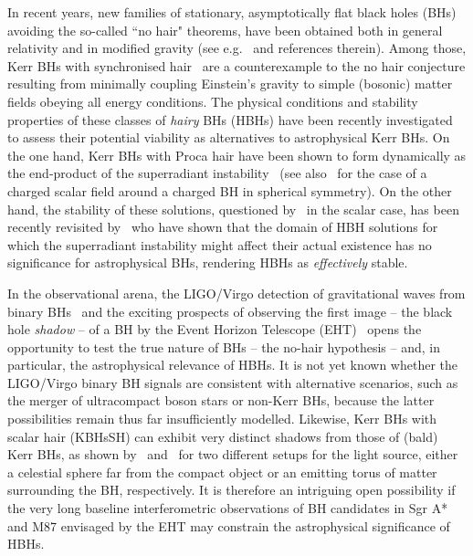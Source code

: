 \documentclass[twocolumn,aps,showpacs,showkeys,prd,superscriptaddress,byrevtex, amsmath]{revtex4-1}
\begin{document}
In recent years, new families of stationary, asymptotically flat black holes (BHs) avoiding the so-called ``no hair" theorems, have been obtained both in general relativity and in modified gravity (see e.g.~\cite{Herdeiro:2015_review} and references therein). Among those, Kerr BHs with synchronised hair~\cite{Herdeiro:2014a,Herdeiro:2016} are a counterexample to the no hair conjecture resulting from minimally coupling Einstein's gravity to simple (bosonic) matter fields obeying all energy conditions. The physical conditions and stability properties of these classes of {\it hairy} BHs  (HBHs) have been recently investigated to assess their potential viability as  alternatives to astrophysical Kerr BHs.  On the one hand, Kerr BHs with Proca hair have been shown to form dynamically as the end-product of the superradiant instability~\cite{East:2017,Herdeiro:2017} (see also~\cite{Sanchis-Gual:2016,Bosch:2016} for the case of a charged scalar field around a charged BH in spherical  symmetry). On the other hand, the stability of these solutions, questioned by~\cite{Ganchev:2018} in the scalar case, has been recently revisited by~\cite{Degollado:2018} who have shown that the domain of HBH solutions for which the superradiant instability might affect their actual existence has no significance for astrophysical BHs, rendering HBHs as {\it effectively} stable.

In the observational arena, the LIGO/Virgo detection of gravitational waves from binary BHs~\cite{Abbott2016, Abbott:2016nmj, Abbott:2017vtc, Abbott:2017oio, Abbott:2017gyy} and the exciting prospects of observing the first image -- the black hole {\it shadow} -- of a BH by the Event Horizon Telescope (EHT)~\cite{Fish:2016} opens the opportunity to test the true nature of BHs -- the no-hair hypothesis -- and, in particular, the astrophysical relevance of HBHs. It is not yet known whether the LIGO/Virgo binary BH signals are consistent with alternative scenarios, such as the merger of ultracompact boson stars or non-Kerr BHs, because the latter possibilities remain thus far insufficiently modelled. Likewise, Kerr BHs with scalar hair (KBHsSH) can exhibit very distinct shadows from those of (bald) Kerr BHs, as shown by~\cite{Cunha:2015} and~\cite{Vincent:2016} for two different setups for the light source, either a celestial sphere far from the compact object or an emitting torus of matter surrounding the BH, respectively. It is therefore an intriguing open possibility if the very long baseline interferometric observations of BH candidates in Sgr A* and M87 envisaged by the EHT may constrain the astrophysical significance of HBHs.
\end{document}
